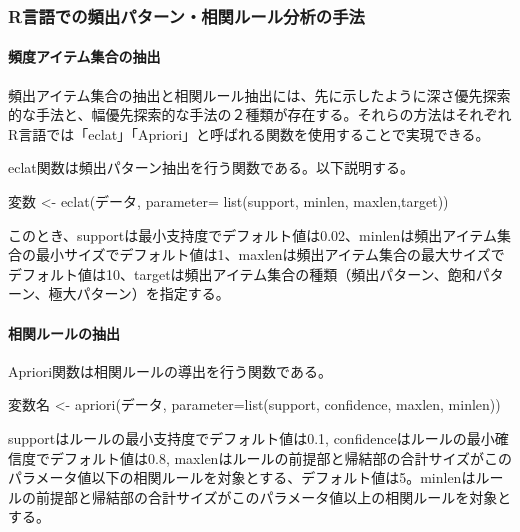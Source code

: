 \documentclass[dvipdfmx]{jsarticle}
\begin{document}
\subsubsection{R言語での頻出パターン・相関ルール分析の手法}
\paragraph{頻度アイテム集合の抽出}
頻出アイテム集合の抽出と相関ルール抽出には、先に示したように深さ優先探索的な手法と、幅優先探索的な手法の２種類が存在する。それらの方法はそれぞれR言語では「eclat」「Apriori」と呼ばれる関数を使用することで実現できる。\par
eclat関数は頻出パターン抽出を行う関数である。以下説明する。
\begin{centering}
  変数 <- eclat(データ, parameter= list(support, minlen, maxlen,target))
\end{centering}
このとき、supportは最小支持度でデフォルト値は0.02、minlenは頻出アイテム集合の最小サイズでデフォルト値は1、maxlenは頻出アイテム集合の最大サイズでデフォルト値は10、targetは頻出アイテム集合の種類（頻出パターン、飽和パターン、極大パターン）を指定する。\par
\paragraph{相関ルールの抽出}
Apriori関数は相関ルールの導出を行う関数である。
\begin{centering}
  変数名 <- apriori(データ, parameter=list(support, confidence, maxlen, minlen))
\end{centering}
supportはルールの最小支持度でデフォルト値は0.1, confidenceはルールの最小確信度でデフォルト値は0.8, maxlenはルールの前提部と帰結部の合計サイズがこのパラメータ値以下の相関ルールを対象とする、デフォルト値は5。minlenはルールの前提部と帰結部の合計サイズがこのパラメータ値以上の相関ルールを対象とする。
\end{document}
